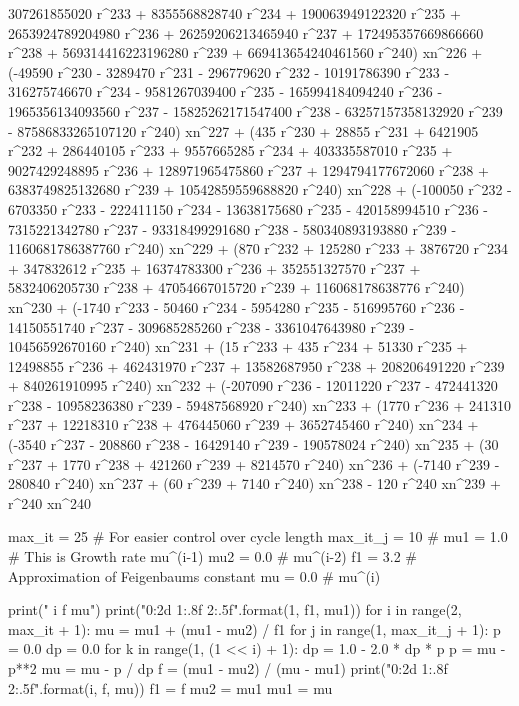        307261855020 r^233 + 8355568828740 r^234 + 
       190063949122320 r^235 + 2653924789204980 r^236 + 
       26259206213465940 r^237 + 172495357669866660 r^238 + 
       569314416223196280 r^239 + 
       669413654240461560 r^240) xn^226 + (-49590 r^230 - 
       3289470 r^231 - 296779620 r^232 - 10191786390 r^233 - 
       316275746670 r^234 - 9581267039400 r^235 - 
       165994184094240 r^236 - 1965356134093560 r^237 - 
       15825262171547400 r^238 - 63257157358132920 r^239 - 
       87586833265107120 r^240) xn^227 + (435 r^230 + 28855 r^231 + 
       6421905 r^232 + 286440105 r^233 + 9557665285 r^234 + 
       403335587010 r^235 + 9027429248895 r^236 + 
       128971965475860 r^237 + 1294794177672060 r^238 + 
       6383749825132680 r^239 + 
       10542859559688820 r^240) xn^228 + (-100050 r^232 - 
       6703350 r^233 - 222411150 r^234 - 13638175680 r^235 - 
       420158994510 r^236 - 7315221342780 r^237 - 
       93318499291680 r^238 - 580340893193880 r^239 - 
       1160681786387760 r^240) xn^229 + (870 r^232 + 125280 r^233 + 
       3876720 r^234 + 347832612 r^235 + 16374783300 r^236 + 
       352551327570 r^237 + 5832406205730 r^238 + 
       47054667015720 r^239 + 
       116068178638776 r^240) xn^230 + (-1740 r^233 - 50460 r^234 - 
       5954280 r^235 - 516995760 r^236 - 14150551740 r^237 - 
       309685285260 r^238 - 3361047643980 r^239 - 
       10456592670160 r^240) xn^231 + (15 r^233 + 435 r^234 + 
       51330 r^235 + 12498855 r^236 + 462431970 r^237 + 
       13582687950 r^238 + 208206491220 r^239 + 
       840261910995 r^240) xn^232 + (-207090 r^236 - 12011220 r^237 - 
       472441320 r^238 - 10958236380 r^239 - 
       59487568920 r^240) xn^233 + (1770 r^236 + 241310 r^237 + 
       12218310 r^238 + 476445060 r^239 + 
       3652745460 r^240) xn^234 + (-3540 r^237 - 208860 r^238 - 
       16429140 r^239 - 190578024 r^240) xn^235 + (30 r^237 + 
       1770 r^238 + 421260 r^239 + 
       8214570 r^240) xn^236 + (-7140 r^239 - 
       280840 r^240) xn^237 + (60 r^239 + 7140 r^240) xn^238 - 
    120 r^240 xn^239 + r^240 xn^240
    
    
    
    
max_it = 25         # For easier control over cycle length
max_it_j = 10       #
mu1 = 1.0           # This is Growth rate mu^(i-1)
mu2 = 0.0           # mu^(i-2)
f1 = 3.2            # Approximation of Feigenbaums constant
mu = 0.0            # mu^(i)
 
print(" i       f         mu")
print("{0:2d}    {1:.8f}      {2:.5f}".format(1, f1, mu1))
for i in range(2, max_it + 1):
    mu = mu1 + (mu1 - mu2) / f1
    for j in range(1, max_it_j + 1):
        p = 0.0
        dp = 0.0
        for k in range(1, (1 << i) + 1):
            dp = 1.0 - 2.0 * dp * p
            p = mu - p**2
        mu = mu - p / dp
    f = (mu1 - mu2) / (mu - mu1)
    print("{0:2d}    {1:.8f}      {2:.5f}".format(i, f, mu))
    f1 = f
    mu2 = mu1
    mu1 = mu
    
    
    
    
    
    
    
    
    
    
    
    
    
    
    
    
    
    
    
    
    
    
    
    
    
    
    
    